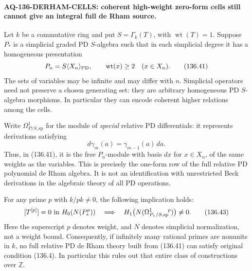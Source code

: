 \paragraph{AQ-136-DERHAM-CELLS: coherent high-weight zero-form cells still cannot give an integral full de Rham source.}
Let $k$ be a commutative ring and put $S=\Gamma_k(T)$,
with $\operatorname{wt}(T)=1$.  Suppose $P_*$ is a
simplicial graded PD $S$-algebra such that in each
simplicial degree it has a homogeneous presentation
\[
                  P_n=S\langle X_n\rangle_{\rm PD},
           \qquad \operatorname{wt}(x)\geq2
                      \quad(x\in X_n).                    \tag{136.41}
\]
The sets of variables may be infinite and may differ
with $n$.  Simplicial operators need not preserve a
chosen generating set: they are arbitrary homogeneous
PD $S$-algebra morphisms.  In particular they can encode
coherent higher relations among the cells.

Write $\Omega^1_{P/S,\mathrm{sp}}$ for the module of
\emph{special} relative PD differentials: it represents
derivations satisfying
\[
                   d\gamma_m(a)=\gamma_{m-1}(a)\,da.
                                                               \tag{136.42}
\]
Thus, in (136.41), it is the free $P_n$-module with
basis $dx$ for $x\in X_n$, of the same weights as
the variables.  This is precisely the one-form row
of the full relative PD polynomial de Rham algebra.
It is not an identification with unrestricted Beck
derivations in the algebraic theory of all PD operations.

For any prime $p$ with $k/pk\ne0$, the following
implication holds:
\[
 [T^{[p]}]=0\ \hbox{in }H_0(N(P_*^p))
 \quad\Longrightarrow\quad
 H_1\bigl(N(\Omega^1_{P_*/S,\mathrm{sp}}{}^{\!p})\bigr)
                                  \ne0.                    \tag{136.43}
\]
Here the superscript $p$ denotes weight, and $N$
denotes simplicial normalization, not a weight bound.
Consequently, if infinitely many rational primes
are nonunits in $k$, no full relative PD de Rham
theory built from (136.41) can satisfy original
condition (136.4).  In particular this rules out
that entire class of constructions over $\mathbb Z$.

